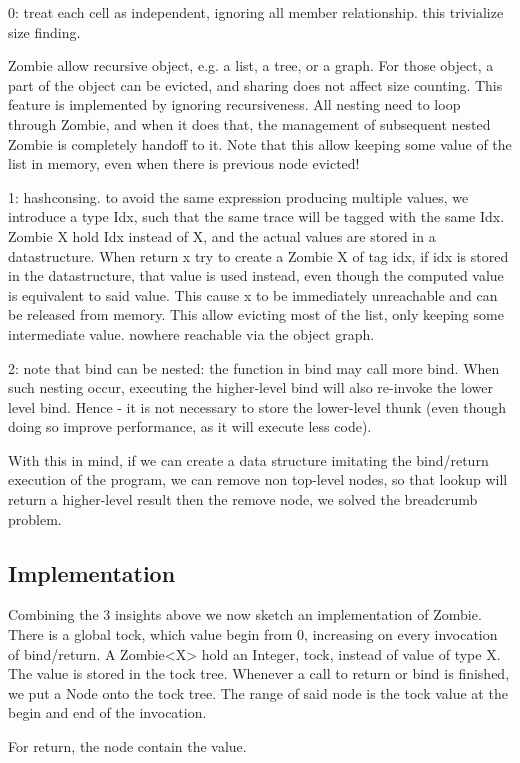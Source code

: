 0: treat each cell as independent, ignoring all member relationship.
this trivialize size finding.

Zombie allow recursive object, e.g. a list, a tree, or a graph.
For those object, a part of the object can be evicted, and sharing does not affect size counting.
This feature is implemented by ignoring recursiveness. All nesting need to loop through Zombie, and when it does that, the management of subsequent nested Zombie is completely handoff to it.
Note that this allow keeping some value of the list in memory, even when there is previous node evicted!

1: hashconsing. to avoid the same expression producing multiple values, we introduce a type Idx, such that the same trace will be tagged with the same Idx.
Zombie X hold Idx instead of X, and the actual values are stored in a datastructure.
When return x try to create a Zombie X of tag idx, if idx is stored in the datastructure, that value is used instead, even though the computed value is equivalent to said value. This cause x to be immediately unreachable and can be released from memory. This allow evicting most of the list, only keeping some intermediate value. nowhere reachable via the object graph.

2: note that bind can be nested: the function in bind may call more bind. When such nesting occur, executing the higher-level bind will also re-invoke the lower level bind. Hence - it is not necessary to store the lower-level thunk (even though doing so improve performance, as it will execute less code).

With this in mind, if we can create a data structure imitating the bind/return execution of the program, we can remove non top-level nodes, so that lookup will return a higher-level result then the remove node, we solved the breadcrumb problem.
\subsection{Implementation}
Combining the 3 insights above we now sketch an implementation of Zombie.
There is a global tock, which value begin from 0, increasing on every invocation of bind/return.
A Zombie<X> hold an Integer, tock, instead of value of type X.
The value is stored in the tock tree.
Whenever a call to return or bind is finished, we put a Node onto the tock tree.
The range of said node is the tock value at the begin and end of the invocation.

For return, the node contain the value.

